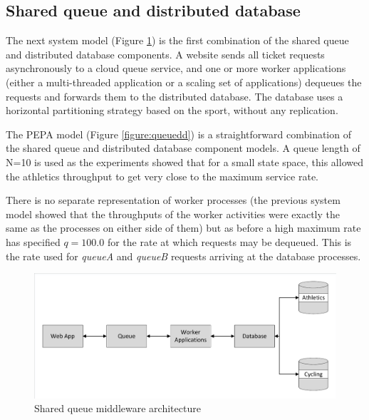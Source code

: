 %
%
\FloatBarrier
\subsection{Shared queue and distributed database}
The next system model (Figure \ref{figure:queuedd_architecture}) is the first combination of the shared queue and distributed database components.  A website sends all ticket requests asynchronously to a cloud queue service, and one or more worker applications (either a multi-threaded application or a scaling set of applications) dequeues the requests and forwards them to the distributed database.  The database uses a horizontal partitioning strategy based on the sport, without any replication.

The PEPA model (Figure \ref{figure:queuedd}) is a straightforward combination of the shared queue and distributed database component models.  A queue length of N=10 is used as the experiments showed that for a small state space, this allowed the athletics throughput to get very close to the maximum service rate.

There is no separate representation of worker processes (the previous system model showed that the throughputs of the worker activities were exactly the same as the processes on either side of them) but as before a high maximum rate has specified $\mathit{q=100.0}$ for the rate at which requests may be dequeued.  This is the rate used for {\itshape queueA} and {\itshape queueB} requests arriving at the database processes.

\begin{figure}
	\centering
	\includegraphics[trim = 5 5 5 5, clip, width=\textwidth]{img/sharedqueue}
	\caption{Shared queue middleware architecture}
	\label{figure:queuedd_architecture}
\end{figure}

